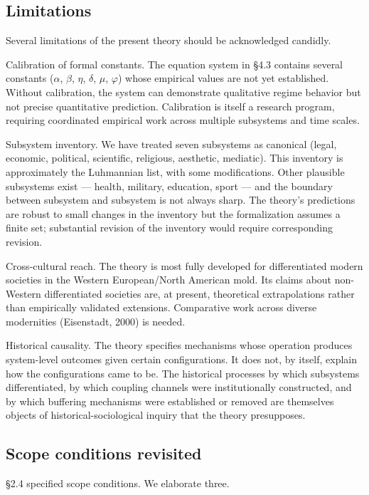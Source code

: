 \documentclass[12pt,a4paper]{article}
\begin{document}
\subsection{Limitations}

Several limitations of the present theory should be acknowledged candidly.


Calibration of formal constants. The equation system in §4.3 contains several constants ($\alpha$, $\beta$, $\eta$, $\delta$, $\mu$, $\varphi$) whose empirical values are not yet established. Without calibration, the system can demonstrate qualitative regime behavior but not precise quantitative prediction. Calibration is itself a research program, requiring coordinated empirical work across multiple subsystems and time scales.


Subsystem inventory. We have treated seven subsystems as canonical (legal, economic, political, scientific, religious, aesthetic, mediatic). This inventory is approximately the Luhmannian list, with some modifications. Other plausible subsystems exist --- health, military, education, sport --- and the boundary between subsystem and subsystem is not always sharp. The theory's predictions are robust to small changes in the inventory but the formalization assumes a finite set; substantial revision of the inventory would require corresponding revision.


Cross-cultural reach. The theory is most fully developed for differentiated modern societies in the Western European/North American mold. Its claims about non-Western differentiated societies are, at present, theoretical extrapolations rather than empirically validated extensions. Comparative work across diverse modernities (Eisenstadt, 2000) is needed.


Historical causality. The theory specifies mechanisms whose operation produces system-level outcomes given certain configurations. It does not, by itself, explain how the configurations came to be. The historical processes by which subsystems differentiated, by which coupling channels were institutionally constructed, and by which buffering mechanisms were established or removed are themselves objects of historical-sociological inquiry that the theory presupposes.

\subsection{Scope conditions revisited}

§2.4 specified scope conditions. We elaborate three.
\end{document}
